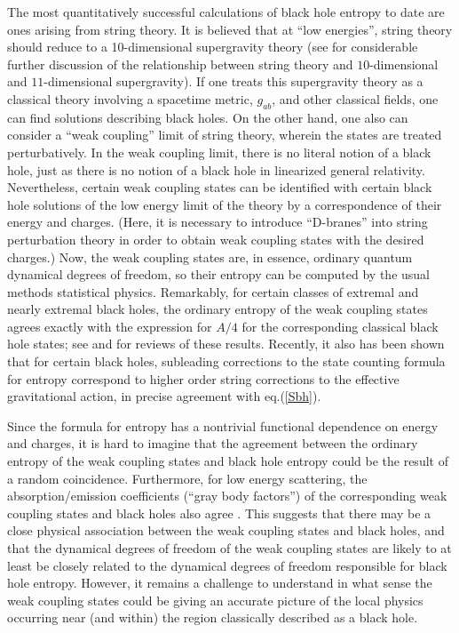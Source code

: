 \documentclass[12pt]{article}
\begin{document}
The most quantitatively successful calculations of black hole entropy
to date are ones arising from string theory. It is believed that at
``low energies'', string theory should reduce to a 10-dimensional
supergravity theory (see \cite{m} for considerable further discussion
of the relationship between string theory and $10$-dimensional and
$11$-dimensional supergravity). If one treats this supergravity theory
as a classical theory involving a spacetime metric, $g_{ab}$, and
other classical fields, one can find solutions describing black
holes. On the other hand, one also can consider a ``weak coupling''
limit of string theory, wherein the states are treated perturbatively.
In the weak coupling limit, there is no literal notion of a black
hole, just as there is no notion of a black hole in linearized general
relativity. Nevertheless, certain weak coupling states can be
identified with certain black hole solutions of the low energy limit
of the theory by a correspondence of their energy and charges. (Here,
it is necessary to introduce ``D-branes'' into string perturbation
theory in order to obtain weak coupling states with the desired
charges.) Now, the weak coupling states are, in essence, ordinary
quantum dynamical degrees of freedom, so their entropy can be computed
by the usual methods statistical physics.  Remarkably, for certain
classes of extremal and nearly extremal black holes, the ordinary
entropy of the weak coupling states agrees exactly with the expression
for $A/4$ for the corresponding classical black hole states; see
\cite{ho} and \cite{peet} for reviews of these results. Recently, it
also has been shown \cite {cwm} that for certain black holes,
subleading corrections to the state counting formula for entropy
correspond to higher order string corrections to the effective
gravitational action, in precise agreement with eq.(\ref{Sbh}).

Since the formula for entropy has a nontrivial functional dependence
on energy and charges, it is hard to imagine that the agreement
between the ordinary entropy of the weak coupling states and black
hole entropy could be the result of a random coincidence. Furthermore,
for low energy scattering, the absorption/emission coefficients
(``gray body factors'') of the corresponding weak coupling states and
black holes also agree \cite{ms}. This suggests that there may be a
close physical association between the weak coupling states and black
holes, and that the dynamical degrees of freedom of the weak coupling
states are likely to at least be closely related to the dynamical
degrees of freedom responsible for black hole entropy. However, it
remains a challenge to understand in what sense the weak coupling
states could be giving an accurate picture of the local physics
occurring near (and within) the region classically described as a
black hole.
\end{document}
